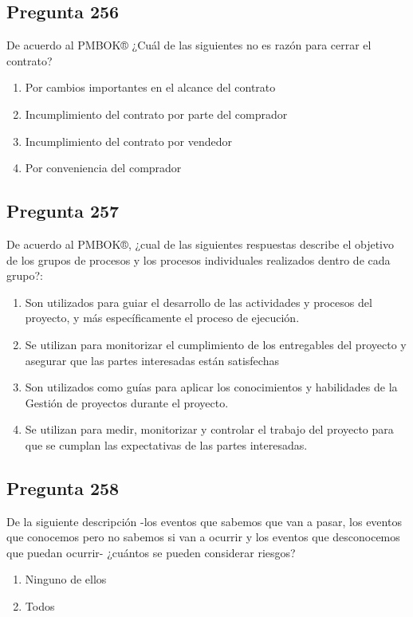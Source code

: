 \documentclass[11pt,a4paper]{article}
\begin{document}
\subsection*{Pregunta 256}
De acuerdo al PMBOK® ¿Cuál de las siguientes no es razón para cerrar el contrato?

\begin{enumerate}[label=\alph*)]
  \item Por cambios importantes en el alcance del contrato
  \item Incumplimiento del contrato por parte del comprador
  \item Incumplimiento del contrato por vendedor
  \item Por conveniencia del comprador
\end{enumerate}

\subsection*{Pregunta 257}
De acuerdo al PMBOK®, ¿cual de las siguientes respuestas describe el objetivo de los grupos de procesos y los procesos individuales realizados dentro de cada grupo?:

\begin{enumerate}[label=\alph*)]
  \item Son utilizados para guiar el desarrollo de las actividades y procesos del proyecto, y más específicamente el proceso de ejecución.
  \item Se utilizan para monitorizar el cumplimiento de los entregables del proyecto y asegurar que las partes interesadas están satisfechas
  \item Son utilizados como guías para aplicar los conocimientos y habilidades de la Gestión de proyectos durante el proyecto.
  \item Se utilizan para medir, monitorizar y controlar el trabajo del proyecto para que se cumplan las expectativas de las partes interesadas.
\end{enumerate}

\subsection*{Pregunta 258}
De la siguiente descripción -los eventos que sabemos que van a pasar, los eventos que conocemos pero no sabemos si van a ocurrir y los eventos que desconocemos que puedan ocurrir- ¿cuántos se pueden considerar riesgos?

\begin{enumerate}[label=\alph*)]
  \item Ninguno de ellos
  \item Todos
\end{enumerate}
\end{document}
